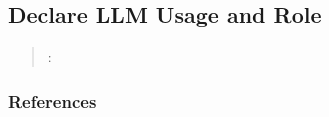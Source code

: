 



\subsection{Declare LLM Usage and Role}
\label{sec:declare-llm-usage-and-role}

\begin{quote}
\summary:  
\end{quote}



\subsubsection{References}





